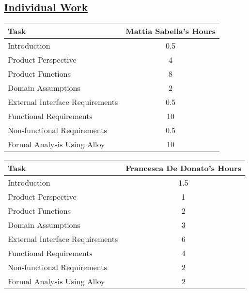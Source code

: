 \subsection[Individual Work]{\hyperlink{toc}{Individual Work}}
\vspace{2mm}
\begin{center}
	\begin{tabular}{| l | c |}
	\hline
	\textbf{Task} & \textbf{Mattia Sabella's Hours} \\ \hline
	Introduction & 0.5 \\ \hline
	Product Perspective & 4 \\ \hline
	Product Functions & 8 \\ \hline
	Domain Assumptions & 2 \\ \hline
	External Interface Requirements & 0.5 \\ \hline
	Functional Requirements & 10 \\ \hline
	Non-functional Requirements & 0.5 \\ \hline
	Formal Analysis Using Alloy & 10 \\
	\hline	
	\end{tabular}
	
	\vspace{2mm}
	
	\begin{tabular}{| l | c |}
	\hline
	\textbf{Task} & \textbf{Francesca De Donato's Hours} \\ \hline
	Introduction & 1.5 \\ \hline
	Product Perspective & 1 \\ \hline
	Product Functions & 2 \\ \hline
	Domain Assumptions & 3 \\ \hline
	External Interface Requirements & 6 \\ \hline
	Functional Requirements & 4 \\ \hline
	Non-functional Requirements & 2 \\ \hline
	Formal Analysis Using Alloy & 2 \\
	\hline	
	\end{tabular}
	
		\vspace{2mm}
	

\end{center}
